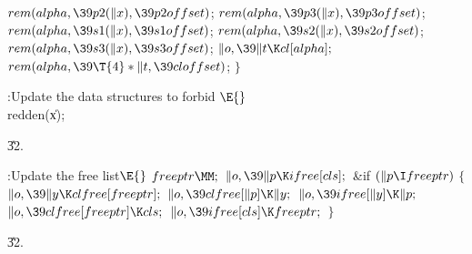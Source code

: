 ${}\\{rem}(\\{alpha},\39\\{p2}(\|x),\39\\{p2offset}){}$;\6
${}\\{rem}(\\{alpha},\39\\{p3}(\|x),\39\\{p3offset}){}$;\6
${}\\{rem}(\\{alpha},\39\\{s1}(\|x),\39\\{s1offset}){}$;\6
${}\\{rem}(\\{alpha},\39\\{s2}(\|x),\39\\{s2offset}){}$;\6
${}\\{rem}(\\{alpha},\39\\{s3}(\|x),\39\\{s3offset}){}$;\6
${}\|o,\39\|t\K\\{cl}[\\{alpha}];{}$\6
${}\\{rem}(\\{alpha},\39\T{4}*\|t,\39\\{cloffset}){}$;\6
\4${}\}{}$\2\par
\fi

\B{}:Update the data structures to forbid \X${}\E{}$\6
\\{redden}(\|x);\par
\U32.\fi

\B{}:Update the free list\X${}\E{}$\6
$\\{freeptr}\MM;{}$\6
${}\|o,\39\|p\K\\{ifree}[\\{cls}];{}$\6
\&{if} ${}(\|p\I\\{freeptr}){}$\5
${}\{{}$\1\6
${}\|o,\39\|y\K\\{clfree}[\\{freeptr}];{}$\6
${}\|o,\39\\{clfree}[\|p]\K\|y;{}$\6
${}\|o,\39\\{ifree}[\|y]\K\|p;{}$\6
${}\|o,\39\\{clfree}[\\{freeptr}]\K\\{cls};{}$\6
${}\|o,\39\\{ifree}[\\{cls}]\K\\{freeptr};{}$\6
\4${}\}{}$\2\par
\U32.\fi


